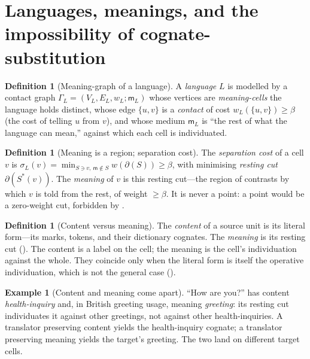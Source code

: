 \documentclass[11pt,a4paper]{article}
\theoremstyle{thmstyle}
\theoremstyle{definition}
\newtheorem{definition}[theorem]{Definition}
\newtheorem{example}[theorem]{Example}
\theoremstyle{remark}
\newcommand{\Gph}{\Gamma}
\newcommand{\Lang}{L}
\newcommand{\V}{V}
\newcommand{\E}{E}
\newcommand{\wt}{w}
\newcommand{\med}{\mathsf{m}}          %
\newcommand{\flo}{\beta}               %
\newcommand{\cut}{\partial}            %
\newcommand{\str}{\sigma}              %
\begin{document}
\section{Languages, meanings, and the impossibility of cognate-substitution}
\label{sec:language}

\begin{definition}[Meaning-graph of a language]
\label{def:meaning-graph}
A \emph{language} $\Lang$ is modelled by a contact graph
$\Gph_\Lang=(\V_\Lang,\E_\Lang,\wt_\Lang;\med_\Lang)$ whose vertices are
\emph{meaning-cells} the language holds distinct, whose edge $\{u,v\}$ is a
\emph{contact} of cost $\wt_\Lang(\{u,v\})\ge\flo$ (the cost of telling $u$
from $v$), and whose medium $\med_\Lang$ is ``the rest of what the language
can mean,'' against which each cell is individuated.
\end{definition}

\begin{definition}[Meaning is a region; separation cost]
\label{def:region}
The \emph{separation cost} of a cell $v$ is $\str_\Lang(v)=
\min_{S\ni v,\ \med\notin S}\wt(\cut(S))\ge\flo$, with minimising
\emph{resting cut} $\cut(S^{\ast}(v))$. The \emph{meaning} of $v$ is this
resting cut---the region of contrasts by which $v$ is told from the rest,
of weight $\ge\flo$. It is never a point: a point would be a zero-weight cut,
forbidden by .
\end{definition}

\begin{definition}[Content versus meaning]
\label{def:content}
The \emph{content} of a source unit is its literal form---its marks, tokens,
and their dictionary cognates. The \emph{meaning} is its resting cut
(). The content is a label on the cell; the meaning is the
cell's individuation against the whole. They coincide only when the literal
form is itself the operative individuation, which is not the general case
().
\end{definition}

\begin{example}[Content and meaning come apart]
\label{ex:howareyou}
``How are you?'' has content \emph{health-inquiry} and, in British greeting
usage, meaning \emph{greeting}: its resting cut individuates it against
other greetings, not against other health-inquiries. A translator preserving
content yields the health-inquiry cognate; a translator preserving meaning
yields the target's greeting. The two land on different target cells.
\end{example}
\end{document}
